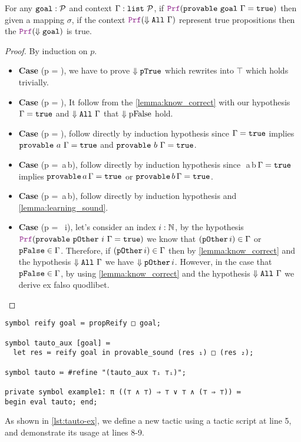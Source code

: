 \begin{theorem}
For any $\texttt{\upshape{goal}}: \mathcal{P}$ and context $\Gamma: \texttt{list}~\mathcal{P}$, if $\prf (\kw{provable}~\kw{goal}~\hyps = \true)$
then given a mapping $\sigma$, if the context $\prf (\deno{\kw{All}~\hyps})$ represent true propositions then the $\prf (\deno{\kw{goal}})$ is true.
\begin{proof} By induction on $p$.
\begin{itemize}
\item[] \textbf{Case} (p = ), we have to prove $\Downarrow \texttt{\upshape{pTrue}}$ which rewrites into $\top$ which holds trivially.
\item[] \textbf{Case} (p = ), It follow from the \cref{lemma:know_correct} with our hypothesis   $\Gamma = \texttt{\upshape{true}}$ and $\Downarrow \texttt{\upshape{All}}~\Gamma$ that $\Downarrow \text{pFalse}$ hold.
\item[] \textbf{Case} (p = ), follow directly by induction hypothesis since   $\Gamma = \texttt{\upshape{true}}$ implies $\texttt{\upshape{provable}}~a~\Gamma = \texttt{\upshape{true}}$ and $\texttt{\upshape{provable}}~b~\Gamma = \texttt{\upshape{true}}$.
\item[] \textbf{Case} (p = \,a\,b), follow directly by induction hypothesis since \,\,a\,b\,$\Gamma = \texttt{\upshape{true}}$ implies $\texttt{\upshape{provable}}\,a\,\Gamma = \texttt{\upshape{true}}$ or $\texttt{\upshape{provable}}\,b\,\Gamma = \texttt{\upshape{true}}$.
\item[] \textbf{Case} (p = \,a\,b), follow directly by induction hypothesis and \cref{lemma:learning_sound}.
\item[] \textbf{Case} (p = ~i), let's consider an index $i: \mathbb{N}$, by the hypothesis $\prf (\kw{provable}~\kw{pOther}~i~\hyps = \true)$  we know that $(\texttt{\upshape{pOther}}\,i) \in \Gamma$ or $\texttt{\upshape{pFalse}} \in \Gamma$. Therefore,
if $(\texttt{\upshape{pOther}}\,i) \in \Gamma$ then by \cref{lemma:know_correct} and the hypothesis $\Downarrow \texttt{\upshape{All}}~\Gamma$ we have $\Downarrow \texttt{\upshape{pOther}}\,i$. However,
in the case that $\texttt{\upshape{pFalse}} \in \Gamma$, by using \cref{lemma:know_correct} and the hypothesis $\Downarrow \texttt{\upshape{All}}~\Gamma$ we derive ex falso quodlibet.
\end{itemize}
\end{proof}
\end{theorem}

\begin{lstlisting}[language=Lambdapi, caption={Usage of Tauto}, label={lst:tauto-ex}]
symbol reify goal ≔ propReify □ goal;

symbol tauto_aux [goal] ≔
  let res ≔ reify goal in provable_sound (res ₁) □ (res ₂);

symbol tauto ≔ #refine "(tauto_aux ⊤ᵢ ⊤ᵢ)";

private symbol example1: π ((⊤ ∧ ⊤) ⇒ ⊤ ∨ ⊤ ∧ (⊤ ⇒ ⊤)) ≔
begin eval tauto; end;
\end{lstlisting}

As shown in \cref{lst:tauto-ex}, we define a new tactic  using a tactic script at line 5, and demonstrate its usage at lines 8-9.
